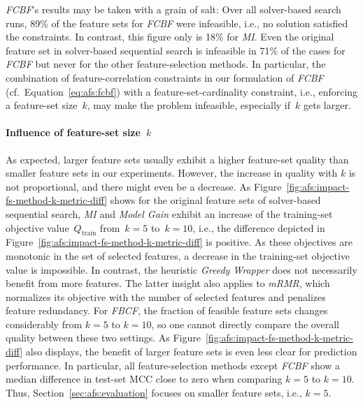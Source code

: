 \documentclass{article}
\theoremstyle{definition}
\begin{document}
\emph{FCBF}'s results may be taken with a grain of salt:
Over all solver-based search runs, 89\% of the feature sets for \emph{FCBF} were infeasible, i.e., no solution satisfied the constraints.
In contrast, this figure only is 18\% for \emph{MI}.
Even the original feature set in solver-based sequential search is infeasible in 71\% of the cases for \emph{FCBF} but never for the other feature-selection methods.
In particular, the combination of feature-correlation constraints in our formulation of \emph{FCBF} (cf.~Equation~\ref{eq:afs:fcbf}) with a feature-set-cardinality constraint, i.e., enforcing a feature-set size~$k$, may make the problem infeasible, especially if~$k$ gets larger.

\paragraph{Influence of feature-set size~$k$}

As expected, larger feature sets usually exhibit a higher feature-set quality than smaller feature sets in our experiments.
However, the increase in quality with $k$ is not proportional, and there might even be a decrease.
As Figure~\ref{fig:afs:impact-fs-method-k-metric-diff} shows for the original feature sets of solver-based sequential search, \emph{MI} and \emph{Model Gain} exhibit an increase of the training-set objective value~$Q_\text{train}$ from~$k=5$ to~$k=10$, i.e., the difference depicted in Figure~\ref{fig:afs:impact-fs-method-k-metric-diff} is positive.
As these objectives are monotonic in the set of selected features, a decrease in the training-set objective value is impossible.
In contrast, the heuristic \emph{Greedy Wrapper} does not necessarily benefit from more features.
The latter insight also applies to \emph{mRMR}, which normalizes its objective with the number of selected features and penalizes feature redundancy.
For \emph{FBCF}, the fraction of feasible feature sets changes considerably from $k=5$ to $k=10$, so one cannot directly compare the overall quality between these two settings.
As Figure~\ref{fig:afs:impact-fs-method-k-metric-diff} also displays, the benefit of larger feature sets is even less clear for prediction performance.
In particular, all feature-selection methods except \emph{FCBF} show a median difference in test-set MCC close to zero when comparing $k=5$ to $k=10$.
Thus, Section~\ref{sec:afs:evaluation} focuses on smaller feature sets, i.e., $k=5$.

\renewcommand*{\bibfont}{\small} %
\printbibliography
\end{document}
